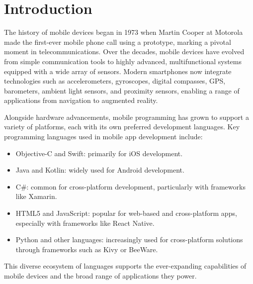 \section{Introduction}

The history of mobile devices began in 1973 when Martin Cooper at Motorola made the first-ever mobile phone call using a prototype, marking a pivotal moment in telecommunications. 
Over the decades, mobile devices have evolved from simple communication tools to highly advanced, multifunctional systems equipped with a wide array of sensors. 
Modern smartphones now integrate technologies such as accelerometers, gyroscopes, digital compasses, GPS, barometers, ambient light sensors, and proximity sensors, enabling a range of applications from navigation to augmented reality.

Alongside hardware advancements, mobile programming has grown to support a variety of platforms, each with its own preferred development languages. 
Key programming languages used in mobile app development include: 
\begin{itemize} 
    \item Objective-C and Swift: primarily for iOS development. 
    \item Java and Kotlin: widely used for Android development. 
    \item C\#: common for cross-platform development, particularly with frameworks like Xamarin.
    \item HTML5 and JavaScript: popular for web-based and cross-platform apps, especially with frameworks like React Native.
    \item Python and other languages: increasingly used for cross-platform solutions through frameworks such as Kivy or BeeWare.
\end{itemize}
This diverse ecosystem of languages supports the ever-expanding capabilities of mobile devices and the broad range of applications they power.